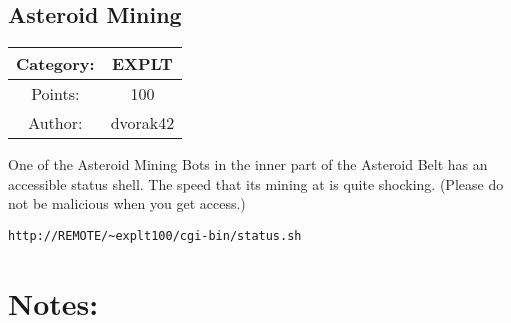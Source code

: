 \begin{center}
\section*{Asteroid Mining}
{\large
\begin{tabular}{| c c |}
\hline
Category: & EXPLT\\\hline
Points: & 100\\\hline
Author: & dvorak42\\\hline
\end{tabular}
}
\end{center}
\vspace{0.5in}

{\large
One of the Asteroid Mining Bots in the inner part of the Asteroid Belt has an accessible status shell. The speed that its mining at is quite shocking. (Please do not be malicious when you get access.)
}
\vspace{0.25in}
\begin{center}
  {\Large\tt http://REMOTE/\~{}explt100/cgi-bin/status.sh}
\end{center}

\vspace{0.25in}
\section*{Notes:}
